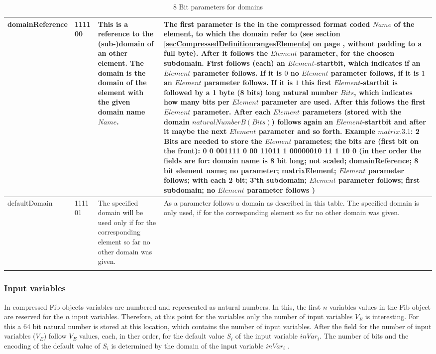 \begin{center}
\begin{longtable}{|p{25mm}|p{15mm}|p{25mm}|p{60mm}|}
	domainReference & 1111 00 & This is a reference to the (sub-)domain of an other element. The domain is the domain of the element with the given domain name $Name$. & The first parameter is the in the compressed format coded $Name$ of the element, to which the domain refer to (see section \ref{secCompressedDefinitionrangesElements} on page \pageref{secCompressedDefinitionrangesElements}, without padding to a full byte). After it follows the $Element$ parameter, for the choosen subdomain. First follows (each) an $Element$-startbit, which indicates if an $Element$ parameter follows. If it is $0$ no $Element$ parameter follows, if it is $1$ an $Element$ parameter follows. If it is $1$ this first $Element$-startbit is followed by a 1 byte (8 bits) long natural number $Bits$, which indicates how many bits per $Element$ parameter are used. After this follows the first $Element$ parameter. After each $Element$ parameters (stored with the domain $ naturalNumberB ( Bits )$) follows again an $Element$-startbit and after it maybe the next $Element$ parameter and so forth. Example $matrix.3.1$: 2 Bits are needed to store the $Element$ parametes; the bits are (first bit on the front): 0 0 001111  0 00 11011  1 00000010 11  1 10  0 (in ther order the fields are for: domain name is 8 bit long; not scaled; domainReference; 8 bit element name; no parameter; matrixElement; $Element$ parameter follows; with each 2 bit; 3'th subdomain; $Element$ parameter follows; first subdomain; no $Element$ parameter follows )\\\hline

	defaultDomain & 1111 01 & The specified domain will be used only if for the corresponding element so far no other domain was given. & As a parameter follows a domain as described in this table. The specified domain is only used, if for the corresponding element so far no other domain was given.\\\hline

\caption{8 Bit parameters for domains}
\label{tableCompressedDefinitionRanges}
\end{longtable}
\end{center}



\subsubsection{Input variables}
\label{secCompressedRootInputVar}

In compressed Fib objects variables are numbered and represented as natural numbers. In this, the first $n$ variables values in the Fib object are reserved for the $n$ input variables. Therefore, at this point for the variables only the number of input variables $V_E$ is interesting. For this a 64 bit natural number is stored at this location, which contains the number of input variables.
After the field for the number of input variables ($V_E$) follow $V_E$ values, each, in ther order, for the default value $S_i$ of the input variable $inVar_i$. The number of bits and the encoding of the default value of $S_i$ is determined by the domain of the input variable $inVar_i$ .


